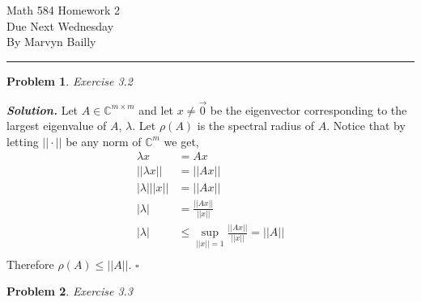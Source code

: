 \documentclass[12pt]{report}
\newtheorem{problem}{Problem}
\newenvironment{solution}[1][\it{Solution}]{\textbf{#1. } }{$\square$}
\def\C{{\mathbb C}}
\begin{document}
\large

\begin{center}
 Math 584 Homework 2\\
 Due Next Wednesday\\
 By Marvyn Bailly\\
\end{center}

\normalsize

\hrule



\begin{problem}
    Exercise 3.2
\end{problem}

\begin{solution}
    \noindent
    Let $A \in \C^{m\times m}$ and let $x \neq \vec{0}$ be the eigenvector corresponding to the largest eigenvalue of $A$, $\lambda$. Let 
    $\rho (A)$ is the spectral radius of $A$. Notice that by letting $||\cdot||$ be any norm of $\C^m$ we get,
    \begin{align*}
        \lambda x &= Ax\\
        ||\lambda x|| &= ||Ax||\\
        |\lambda| ||x|| &= ||Ax||\\
        |\lambda| &= \frac{||Ax||}{||x||}\\
        |\lambda| &\leq \sup_{||x|| = 1} \frac{||Ax||}{||x||} = ||A||\\
    \end{align*}
    Therefore $\rho(A) \leq ||A||$.
\end{solution}

\newpage



\begin{problem}
    Exercise 3.3
\end{problem}
\end{document}
